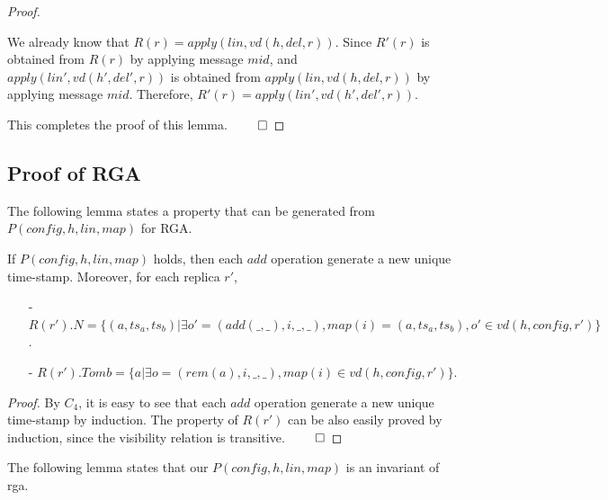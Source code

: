 {\begin {proof}
\begin{itemize}
    We already know that $R(r) = \mathit{apply}(\mathit{lin},\mathit{vd}(h,\mathit{del},r))$. Since $R'(r)$ is obtained from $R(r)$ by applying message $\mathit{mid}$, and $\mathit{apply}(\mathit{lin}',\mathit{vd}(h',\mathit{del}',r))$ is obtained from $\mathit{apply}(\mathit{lin},\mathit{vd}(h,\mathit{del},r))$ by applying message $\mathit{mid}$. Therefore, $R'(r) = \mathit{apply}(\mathit{lin}',\mathit{vd}(h',\mathit{del}',r))$.
\end{itemize}

This completes the proof of this lemma. $\qed$
\end {proof}




\subsection{Proof of RGA}
\label{subsec:appendix proofs of rga}

The following lemma states a property that can be generated from $P(\mathit{config},h,\mathit{lin},\mathit{map})$ for RGA.

\begin{lemma}
\label{lemma:a property that can be obtained from P for rga}
If $P(\mathit{config},h,\mathit{lin},\mathit{map})$ holds, then each $\mathit{add}$ operation generate a new unique time-stamp. Moreover, for each replica $r'$,

\begin{itemize}
    \setlength{\itemsep}{0.5pt}
    \item[-] $R(r').N = \{ (a,\mathit{ts}_a,\mathit{ts}_b) \vert \exists o' = (\mathit{add}(\_,\_),i,\_,\_), \mathit{map}(i) = (a,\mathit{ts}_a,\mathit{ts}_b), o' \in \mathit{vd}(h,\mathit{config},r') \}$.

    \item[-] $R(r').\mathit{Tomb} = \{ a \vert \exists o = (\mathit{rem}(a),i,\_,\_), \mathit{map}(i) \in \mathit{vd}(h,\mathit{config},r') \}$.
    \end{itemize}
\end{lemma}

\begin {proof}
By $C_4$, it is easy to see that each $\mathit{add}$ operation generate a new unique time-stamp by induction. The property of $R(r')$ can be also easily proved by induction, since the visibility relation is transitive. $\qed$
\end {proof}


The following lemma states that our $P(\mathit{config},h,\mathit{lin},\mathit{map})$ is an invariant of rga.

}
